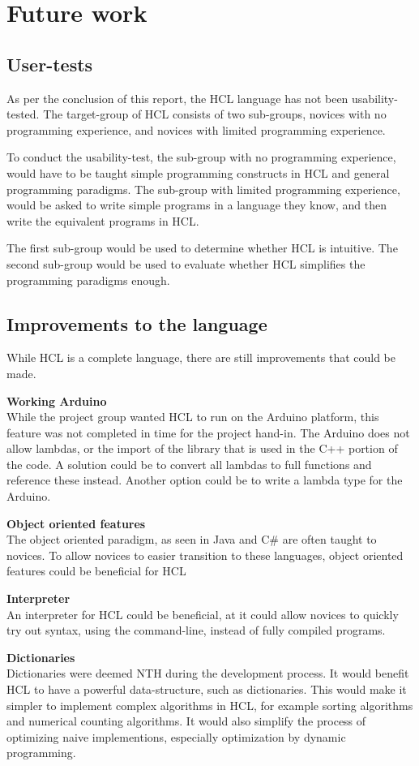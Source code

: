 \section{Future work}

\subsection{User-tests}
As per the conclusion of this report, the HCL language has not been usability-tested.
The target-group of HCL consists of two sub-groups, novices with no programming experience, and novices with limited programming experience.

To conduct the usability-test, the sub-group with no programming experience, would have to be taught simple programming constructs in HCL and general programming paradigms.
The sub-group with limited programming experience, would be asked to write simple programs in a language they know, and then write the equivalent programs in HCL.

The first sub-group would be used to determine whether HCL is intuitive.
The second sub-group would be used to evaluate whether HCL simplifies the programming paradigms enough.

\subsection{Improvements to the language}
While HCL is a complete language, there are still improvements that could be made.

\textbf{Working Arduino}\\
While the project group wanted HCL to run on the Arduino platform, this feature was not completed in time for the project hand-in.
The Arduino does not allow lambdas, or the import of the library that is used in the C++ portion of the code.
A solution could be to convert all lambdas to full functions and reference these instead.
Another option could be to write a lambda type for the Arduino.

\textbf{Object oriented features}\\
The object oriented paradigm, as seen in Java and C\# are often taught to novices.
To allow novices to easier transition to these languages, object oriented features could be beneficial for HCL

\textbf{Interpreter}\\
An interpreter for HCL could be beneficial, at it could allow novices to quickly try out syntax, using the command-line, instead of fully compiled programs.

\textbf{Dictionaries}\\
Dictionaries were deemed NTH during the development process.
It would benefit HCL to have a powerful data-structure, such as dictionaries.
This would make it simpler to implement complex algorithms in HCL, for example sorting algorithms and numerical counting algorithms.
It would also simplify the process of optimizing naive implementions, especially optimization by dynamic programming.

